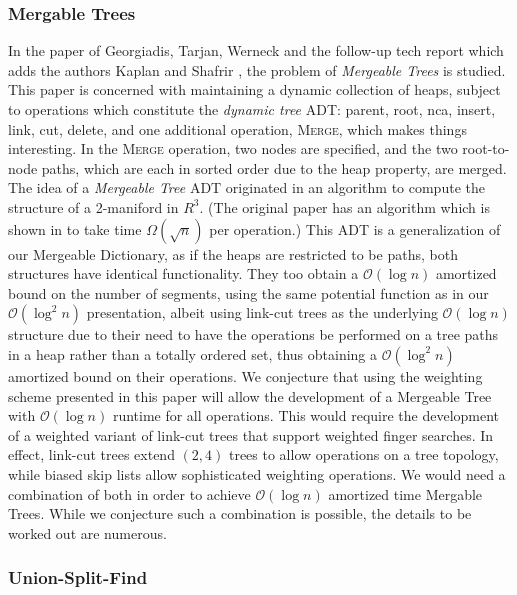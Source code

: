 \documentclass[11pt]{article}
\newcommand{\Ds}{Mergeable Dictionary}
\newcommand{\kwUnion}{Merge}
\newcommand{\Union}{\mbox{\textsc{\kwUnion{}}}}
\newcommand{\segments}{{\segment}s}
\newcommand{\segment}{segment}
\newcommand{\op}[1]{#1}
\begin{document}
\subsubsection{Mergable Trees} 


In the paper of Georgiadis, Tarjan, Werneck \cite{conf/soda/GeorgiadisTW06} and the follow-up tech report which adds the authors Kaplan and Shafrir \cite{DBLP:journals/talg/GeorgiadisKSTW11}, the problem of \emph{Mergeable Trees} is studied. This paper is concerned with maintaining a dynamic collection of heaps, subject to operations which constitute the \emph{dynamic tree} ADT: \op{parent}, \op{root}, \op{nca}, \op{insert}, \op{link}, \op{cut}, \op{delete}, and one additional operation, \Union{}, which makes things interesting. In the \Union{} operation, two nodes are specified, and the two root-to-node paths, which are each in sorted order due to the heap property, are merged. The idea of a \emph{Mergeable Tree} ADT originated in an algorithm to compute the structure of a 2-maniford in $R^3$. (The original paper has an algorithm which is shown in \cite{journals/dcg/AgarwalEHW06} to take time $\Omega(\sqrt{n})$ per operation.) 
This ADT is a generalization of our \Ds{}, as if the heaps are restricted to be paths, both structures have identical functionality. They too obtain a $\mathcal O(\log n)$ amortized bound on the number of \segments{}, using the same potential function as in our $\mathcal O(\log^2n)$ presentation, albeit using link-cut trees \cite{journals/jcss/SleatorT83} as the underlying $\mathcal O(\log n)$ structure due to their need to have the operations be performed on a tree paths in a heap rather than a totally ordered set, thus obtaining a $\mathcal O(\log^2 n)$ amortized bound on their operations. We conjecture that using the weighting scheme presented in this paper will allow the development of a Mergeable Tree with $\mathcal O(\log n)$ runtime for all operations. This would require the development of a weighted variant of link-cut trees that support weighted finger searches. In effect, link-cut trees extend $(2,4)$ trees to allow operations on a tree topology, while biased skip lists allow sophisticated weighting operations. We would need a combination of both in order to achieve $\mathcal O(\log n)$ amortized time Mergable Trees. While we conjecture such a combination is possible, the details to be worked out are numerous. 

\subsubsection{Union-Split-Find} 
\end{document}
